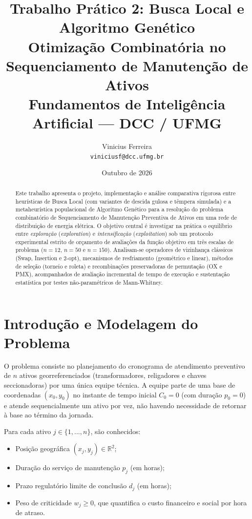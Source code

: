 \documentclass[11pt,a4paper]{article}
\title{\textbf{Trabalho Prático 2: Busca Local e Algoritmo Genético}\\
\large Otimização Combinatória no Sequenciamento de Manutenção de Ativos\\
\small Fundamentos de Inteligência Artificial --- DCC / UFMG}
\author{Vinicius Ferreira \\ \texttt{viniciusf@dcc.ufmg.br}}
\date{Outubro de 2026}
\begin{document}
\maketitle

\begin{abstract}
Este trabalho apresenta o projeto, implementação e análise comparativa rigorosa entre heurísticas de Busca Local (com variantes de descida gulosa e têmpera simulada) e a metaheurística populacional de Algoritmo Genético para a resolução do problema combinatório de Sequenciamento de Manutenção Preventiva de Ativos em uma rede de distribuição de energia elétrica. O objetivo central é investigar na prática o equilíbrio entre \emph{exploração} (\emph{exploration}) e \emph{intensificação} (\emph{exploitation}) sob um protocolo experimental estrito de orçamento de avaliações da função objetivo em três escalas de problema ($n=12$, $n=50$ e $n=150$). Analisam-se operadores de vizinhança clássicos (Swap, Insertion e 2-opt), mecanismos de resfriamento (geométrico e linear), métodos de seleção (torneio e roleta) e recombinações preservadoras de permutação (OX e PMX), acompanhados de avaliação incremental de tempo de execução e sustentação estatística por testes não-paramétricos de Mann-Whitney.
\end{abstract}

\section{Introdução e Modelagem do Problema}

O problema consiste no planejamento do cronograma de atendimento preventivo de $n$ ativos georreferenciados (transformadores, religadores e chaves seccionadoras) por uma única equipe técnica. A equipe parte de uma base de coordenadas $(x_0, y_0)$ no instante de tempo inicial $C_0 = 0$ (com duração $p_0 = 0$) e atende sequencialmente um ativo por vez, não havendo necessidade de retornar à base ao término da jornada.

Para cada ativo $j \in \{1, \dots, n\}$, são conhecidos:
\begin{itemize}
    \item Posição geográfica $(x_j, y_j) \in \mathbb{R}^2$;
    \item Duração do serviço de manutenção $p_j$ (em horas);
    \item Prazo regulatório limite de conclusão $d_j$ (em horas);
    \item Peso de criticidade $w_j \ge 0$, que quantifica o custo financeiro e social por hora de atraso.
\end{itemize}
\end{document}
